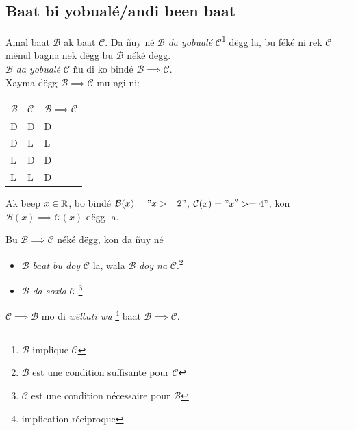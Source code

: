 \documentclass[twoside, a4paper]{article}
\begin{document}
\subsection{Baat bi yobualé/andi been baat}
\begin{tcolorbox}[enhanced jigsaw,breakable,pad at break*=1mm, colback=red!5!white,colframe=white!75!black,title= Téeki,
  watermark color=white]
Amal baat $\mathcal{B}$ ak baat $\mathcal{C}$. Da ñuy né $\mathcal{B}$ \textit{da yobualé  }$\mathcal{C}$\footnote{$\mathcal{B}$ implique $\mathcal{C}$} dëgg la, bu féké ni rek $\mathcal{C}$ mënul bagna nek dëgg bu $\mathcal{B}$ néké dëgg.\\
$\mathcal{B}$ \textit{da yobualé  }$\mathcal{C}$  ñu di ko bindé $\mathcal{B} \implies \mathcal{C}$.\\

Xayma dëgg $\mathcal{B} \implies \mathcal{C}$ mu ngi ni:\\

\begin{tabularx}{0.8\textwidth} { 
  | >{\centering\arraybackslash}X 
  | >{\centering\arraybackslash}X 
  | >{\centering\arraybackslash}X |}
 \hline
$\mathcal{B}$& $\mathcal{C}$ & $\mathcal{B}\implies\mathcal{C}$\\
 \hline
 D  & D & D \\
 D  & L & L \\
 L  & D & D \\
 L  & L & D \\
\hline
\end{tabularx}
\end{tcolorbox}

Ak beep $x\in\mathbb{R}$, bo bindé $\mathcal{B}(x) = "x >= 2"$, $\mathcal{C}(x) = "x^2 >= 4"$, kon $\mathcal{B}(x) \implies \mathcal{C}(x)$ dëgg la.


\begin{tcolorbox}[enhanced jigsaw,breakable,pad at break*=1mm, colback=red!5!white,colframe=white!75!black,title= Téeki,
  watermark color=white]
Bu $\mathcal{B} \implies \mathcal{C}$ néké dëgg, kon da ñuy né
\begin{itemize}
    \item $\mathcal{B}$ \textit{baat bu doy} $\mathcal{C}$ la, wala $\mathcal{B}$ \textit{doy na} $\mathcal{C}$.\footnote{$\mathcal{B}$ est une condition suffisante pour $\mathcal{C}$}
    \item $\mathcal{B}$ \textit{da soxla} $\mathcal{C}$.\footnote{$\mathcal{C}$ est une condition nécessaire pour $\mathcal{B}$}
\end{itemize}

$\mathcal{C} \implies \mathcal{B}$ mo di \textit{wëlbati wu} \footnote{implication réciproque} baat $\mathcal{B} \implies \mathcal{C}$.
\end{tcolorbox}
\end{document}
